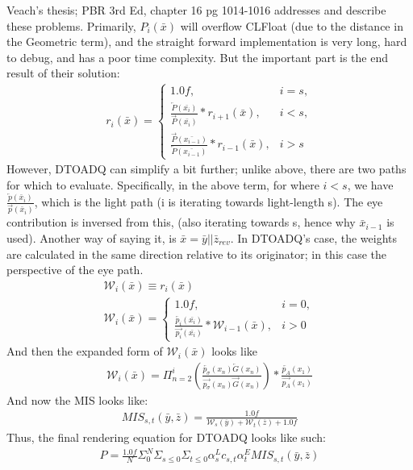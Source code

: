 \documentclass{article}
\begin{document}
Veach's thesis; PBR 3rd Ed, chapter 16 pg 1014-1016 addresses and describe these
problems. Primarily, $P_i(\bar{x})$ will overflow CLFloat (due to the distance
in the Geometric term), and the straight forward implementation is very long,
hard to debug, and has a poor time complexity. But the important part is the end
result of their solution:
  \begin{align}
    r_i (\bar{x}) = 
    \begin{cases}
      1.0f, & i = s,\\
      \frac{\overleftarrow{P}(\bar{x_i})}{\overrightarrow{P}(\bar{x_i})} *
      r_{i+1}(\bar{x}), & i < s,\\
      \frac{\overrightarrow{P}(\bar{x_{i-1}})}{\overleftarrow{P}(\bar{x_{i-1}})}
      * r_{i-1}(\bar{x}), & i > s
    \end{cases}
  \end{align}
    However, DTOADQ can simplify a bit further; unlike above, there are two
paths for which to evaluate. Specifically, in the above term, for where $i < s$,
we have $\frac{\overleftarrow{p}(\bar{x}_i)}{\overrightarrow{p}(\bar{x}_i)}$,
which is the light path (i is iterating towards light-length s). The eye
contribution is inversed from this, (also iterating towards s, hence why
$\bar{x}_{i-1}$ is used). Another way of saying it, is $\bar{x} = \bar{y} ||
\bar{z}_{rev}$. In DTOADQ's case, the weights are calculated in the same
direction relative to its originator; in this case the perspective of the eye
path.
  \begin{align}
    \mathcal{W}_i(\bar{x}) \equiv r_i(\bar{x})\\
    \mathcal{W}_i (\bar{x}) = 
    \begin{cases}
      1.0f, & i = 0,\\
      \frac{\overleftarrow{p_i}(\bar{x_i})}{\overrightarrow{p_i}(\bar{x_i})} *
      \mathcal{W}_{i-1}(\bar{x}), & i > 0
    \end{cases}
  \end{align}
    And then the expanded form of $\mathcal{W}_i(\bar{x})$ looks like
  \begin{align}
    \mathcal{W}_i(\bar{x}) = \Pi_{n=2}^i(\frac{\overleftarrow
    {p_{\sigma}}(x_n)\overleftarrow {G}(x_n)}
    {\overrightarrow{p_{\sigma}}(x_n)\overrightarrow{G}(x_n)})
    * \frac{\overleftarrow{p_A}(x_1)}{\overrightarrow{p_A}(x_1)}
  \end{align}
    And now the MIS looks like:
  \begin{align}
    MIS_{s, t}(\bar{y}, \bar{z}) =
    \frac{1.0f}{\mathcal{W}_s(\bar{y}) + \mathcal{W}_t(\bar{z}) + 1.0f}
  \end{align}
    Thus, the final rendering equation for DTOADQ looks like such:
  \begin{align}
    P = \frac{1.0f}{N} \Sigma_{0}^{N} \Sigma_{s \le 0} \Sigma_{t \le 0}
    \alpha^L_s c_{s,t} \alpha^E_t MIS_{s, t}(\bar{y}, \bar{z})
  \end{align}
\end{document}
